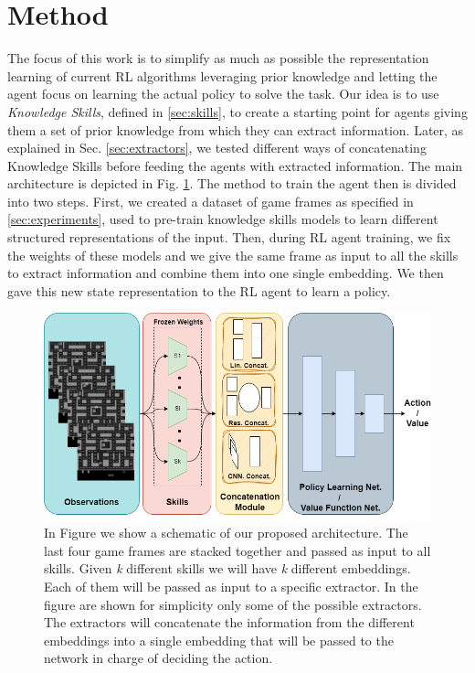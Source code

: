 
\section{Method}
\label{sec:method}


The focus of this work is to simplify as much as possible the representation learning of current RL algorithms leveraging prior knowledge and letting the agent focus on learning the actual policy to solve the task. Our idea is to use \textit{Knowledge Skills}, defined in \ref{sec:skills}, to create a starting point for agents giving them a set of prior knowledge from which they can extract information. Later, as explained in Sec. \ref{sec:extractors}, we tested different ways of concatenating Knowledge Skills before feeding the agents with extracted information.
The main architecture is depicted in Fig. \ref{fig:main_architecture}.
The method to train the agent then is divided into two steps.
First, we created a dataset of game frames as specified in \ref{sec:experiments}, used to pre-train knowledge skills models to learn different structured representations of the input. Then, during RL agent training, we fix the weights of these models and we give the same frame as input to all the skills to extract information and combine them into one single embedding. We then gave this new state representation to the RL agent to learn a policy.

\begin{figure}[ht]
    \begin{center}
        \includegraphics[width=\textwidth]{images/main_architecture.png}
    \end{center}
    \caption{In Figure we show a schematic of our proposed architecture. The last four game frames are stacked together and passed as input to all skills.  Given \textit{k} different skills we will have \textit{k} different embeddings. Each of them will be passed as input to a specific extractor. In the figure are shown for simplicity only some of the possible extractors. The extractors will concatenate the information from the different embeddings into a single embedding that will be passed to the network in charge of deciding the action.}
    \label{fig:main_architecture}
\end{figure}

